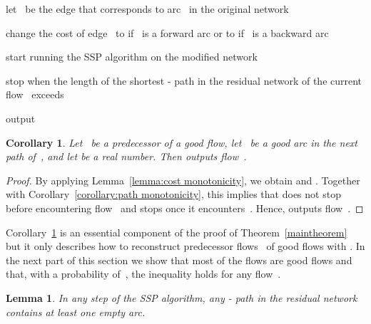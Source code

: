 \documentclass[11pt]{article}
\newtheorem{lemma}[theorem]{Lemma}
\newtheorem{corollary}[theorem]{Corollary}
\begin{document}
\begin{algorithm}[t]
  \caption{.}
  \begin{algorithmic}[1]
    \STATE let~ be the edge that corresponds to arc~ in the original network~

    \STATE change the cost of edge~ to  if~ is a forward arc or to  if~ is a backward arc

    \STATE start running the SSP algorithm on the modified network~

    \STATE stop when the length of the shortest - path in the residual network of the current flow~ exceeds~

    \STATE output~
  \end{algorithmic}
  \label{reconstruct}
\end{algorithm}


\begin{corollary}
\label{corollary:flow reconstruction}
Let~ be a predecessor of a good flow, let~ be a good arc in the next path of~, and let  be a real number. Then  outputs flow~.
\end{corollary}

\begin{proof}
By applying Lemma~\ref{lemma:cost monotonicity}, we obtain  and . Together with Corollary~\ref{corollary:path monotonicity}, this implies that  does not stop before encountering flow~ and stops once it encounters~. Hence,  outputs flow~. \end{proof}

Corollary~\ref{corollary:flow reconstruction} is an essential component of the proof of Theorem~\ref{maintheorem} but it only describes how to reconstruct predecessor flows~ of good flows with . In the next part of this section we show that
most of the flows are
good flows and that, with a probability of~, the inequality  holds for any flow~.

\begin{lemma}
\label{lemma:one empty arc}
In any step of the SSP algorithm, any - path in the residual network contains at least one empty arc.
\end{lemma}
\end{document}
